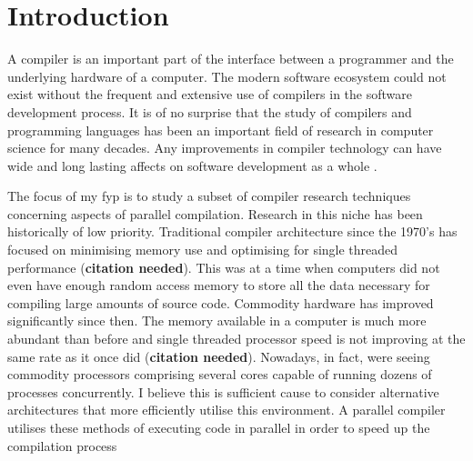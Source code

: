 \chapter{Introduction} \label{introduction}

A \gls{compiler} is an important part of the interface between a programmer
and the underlying hardware of a computer. The modern software ecosystem
could not exist without the frequent and extensive use of compilers in
the software development process. It is of no surprise that the study of
compilers and programming languages has been an important field of research
in computer science for many decades. Any improvements in compiler technology
can have wide and long lasting affects on software development as a whole
\citep{hall_compiler_2009}.

The focus of my \gls{fyp} is to study a subset of compiler research techniques
concerning aspects of parallel compilation. Research in this niche has been
historically of low priority. Traditional compiler architecture since the
1970’s has focused on minimising memory use and optimising for single threaded
performance (\textbf{citation needed}). This was at a time when computers
did not even have enough random access memory to store all the data necessary
for compiling large amounts of source code. Commodity hardware has improved
significantly since then. The memory available in a computer is much more
abundant than before and single threaded processor speed is not improving at
the same rate as it once did (\textbf{citation needed}). Nowadays, in fact,
were seeing commodity processors comprising several cores capable of running
dozens of processes concurrently. I believe this is sufficient cause to consider
alternative architectures that more efficiently utilise this environment. A
parallel compiler utilises these methods of executing code in parallel in order
to speed up the compilation process

